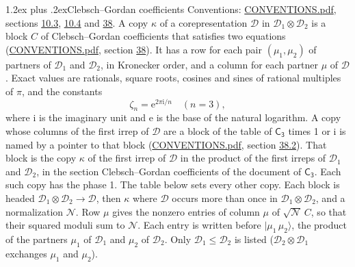 \documentclass[10pt,a4paper]{article}
\makeatletter
\renewcommand\section{\@startsection{section}{1}{\z@}{-3ex plus -1ex minus -.2ex}%
  {1.2ex plus .2ex}{\normalfont\large\sffamily\bfseries\color{parttitle}}}
\numberwithin{equation}{section}
\newcommand{\grp}[1]{\mathsf{#1}}
\newcommand{\iunit}{\mathrm{i}}
\newcommand{\expe}{\mathrm{e}}
\newcommand{\rootunity}[1]{\zeta_{#1}}
\newcommand{\irrprod}{\otimes}
\newcommand{\mult}{\kappa}
\newcommand{\intx}{\mu}
\newcommand{\cgnorm}{\mathcal{N}}
\newcommand{\prodket}[2]{\lvert {#1}\,{#2}\rangle}
\makeatother
\begin{document}
\section{Clebsch--Gordan coefficients}\label{s:clebsch_gordan}
Conventions: \href{../../CONVENTIONS.pdf}{CONVENTIONS.pdf}, sections \href{../../../rotation/CONVENTIONS.pdf\#conv.10.3}{10.3}, \href{../../../rotation/CONVENTIONS.pdf\#conv.10.4}{10.4} and \href{../../CONVENTIONS.pdf\#conv.38}{38}.
\leavevmode\label{n:index.copy}\label{n:matrix.cg.stored}A copy $\mult$ of a corepresentation $\mathcal{D}$ in $\mathcal{D}_1\irrprod\mathcal{D}_2$ is a block $C$ of Clebsch--Gordan coefficients that satisfies two equations (\href{../../CONVENTIONS.pdf}{CONVENTIONS.pdf}, section \href{../../CONVENTIONS.pdf\#conv.38}{38}). \label{n:index.cg}It has a row for each pair $(\intx_1, \intx_2)$ of partners of $\mathcal{D}_1$ and $\mathcal{D}_2$, in Kronecker order, and a column for each partner $\intx$ of $\mathcal{D}$.
\leavevmode\label{n:constant.root}\label{n:index.root.order}Exact values are rationals, square roots, cosines and sines of rational multiples of $\pi$, and the constants
\begin{equation}\label{e:constants}\rootunity{n} = \expe^{2\pi\iunit/n}\quad(n = 3),\end{equation}
where $\iunit$ is the imaginary unit and $\expe$ is the base of the natural logarithm.
A copy whose columns of the first irrep of $\mathcal{D}$ are a block of the table of $\grp{C_{3}}$ times 1 or $\iunit$ is named by a pointer to that block (\href{../../CONVENTIONS.pdf}{CONVENTIONS.pdf}, section \href{../../CONVENTIONS.pdf\#conv.38.2}{38.2}). That block is the copy $\mult$ of the first irrep of $\mathcal{D}$ in the product of the first irreps of $\mathcal{D}_1$ and $\mathcal{D}_2$, in the section Clebsch--Gordan coefficients of the document of \href{../../../rotation/data/pdf/C3.pdf}{$\grp{C_{3}}$}. Each such copy has the phase 1. The table below sets every other copy.
Each block is headed $\mathcal{D}_1\irrprod\mathcal{D}_2\to\mathcal{D}$, then $\mult$ where $\mathcal{D}$ occurs more than once in $\mathcal{D}_1\irrprod\mathcal{D}_2$, and a normalization $\cgnorm$. Row $\intx$ gives the nonzero entries of column $\intx$ of $\sqrt{\cgnorm}\,C$, so that their squared moduli sum to $\cgnorm$. \label{n:vector.ket.product}Each entry is written before $\prodket{\intx_1}{\intx_2}$, the product of the partners $\intx_1$ of $\mathcal{D}_1$ and $\intx_2$ of $\mathcal{D}_2$. Only $\mathcal{D}_1 \le \mathcal{D}_2$ is listed ($\mathcal{D}_2\irrprod\mathcal{D}_1$ exchanges $\intx_1$ and $\intx_2$).
\end{document}
